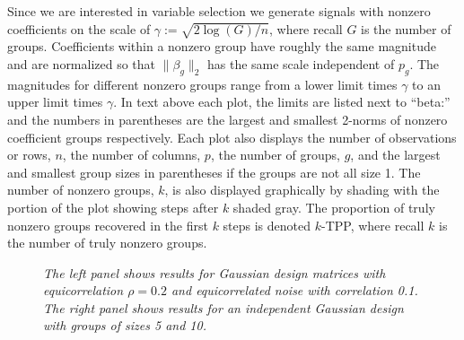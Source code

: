 \documentclass{imsart}
\begin{document}
Since we are interested in variable selection we generate signals with
nonzero coefficients on the scale of $\gamma := \sqrt{2 \log(G)/n}$,
where recall $G$ is the number of groups.
Coefficients within a
nonzero group have roughly the same magnitude and are normalized
so that $\| \beta_g \|_2$ has the same scale independent of $p_g$.
The magnitudes for different
nonzero groups range from a lower limit times $\gamma$ to an upper
limit times $\gamma$. In text above each plot, the limits are listed
next to ``beta:'' and the numbers in parentheses are the largest
and smallest 2-norms of nonzero coefficient groups respectively.
Each plot also displays the
number of observations or rows, $n$, the number of columns, $p$, the
number of groups, $g$, and the largest and smallest group sizes in
parentheses if the groups are not all size 1. The number of nonzero
groups, $k$, is also displayed graphically by shading with the portion
of the plot showing steps after $k$ shaded gray.
The proportion of truly
nonzero groups recovered in the first $k$ steps is denoted $k$-TPP,
where recall $k$ is the number of truly nonzero groups. 

\begin{figure}[h]
\begin{center}
\hspace{-15pt}
\caption{\small \it The left panel shows results for Gaussian design
matrices with equicorrelation $\rho=0.2$ and equicorrelated noise with
correlation 0.1. The right panel shows results for an independent
Gaussian design with groups of sizes 5 and 10.}
\end{center}
\end{figure}
\end{document}
